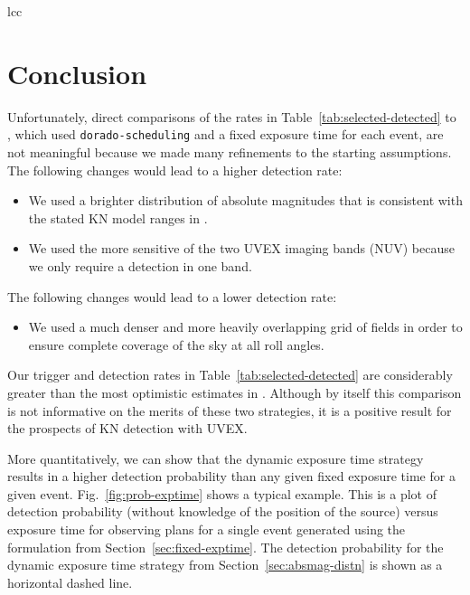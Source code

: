 \documentclass[twocolumn,times]{aastex631}
\begin{document}
\begin{deluxetable}{lcc}
    \startdata
    
    \enddata
\end{deluxetable}

\section{Conclusion}

Unfortunately, direct comparisons of the rates in Table~\ref{tab:selected-detected} to \citet{2025arXiv250114109C}, which used \texttt{dorado-scheduling} and a fixed exposure time for each event, are not meaningful because we made many refinements to the starting assumptions. The following changes would lead to a higher detection rate:
%
\begin{itemize}
    \item We used a brighter distribution of absolute magnitudes that is consistent with the stated \ac{KN} model ranges in \citet{2021arXiv211115608K}.
    \item We used the more sensitive of the two \ac{UVEX} imaging bands (\ac{NUV}) because we only require a detection in one band.
\end{itemize}
%
The following changes would lead to a lower detection rate:
%
\begin{itemize}
    \item We used a much denser and more heavily overlapping grid of fields in order to ensure complete coverage of the sky at all roll angles.
\end{itemize}
%
Our trigger and detection rates in Table~\ref{tab:selected-detected} are considerably greater than the most optimistic estimates in \citet{2025arXiv250114109C}. Although by itself this comparison is not informative on the merits of these two strategies, it is a positive result for the prospects of \ac{KN} detection with \ac{UVEX}.

More quantitatively, we can show that the dynamic exposure time strategy results in a higher detection probability than any given fixed exposure time for a given event. Fig.~\ref{fig:prob-exptime} shows a typical example. This is a plot of detection probability (without knowledge of the position of the source) versus exposure time for observing plans for a single event generated using the formulation from Section~\ref{sec:fixed-exptime}. The detection probability for the dynamic exposure time strategy from Section~\ref{sec:absmag-distn} is shown as a horizontal dashed line.
\end{document}
